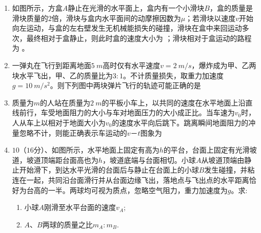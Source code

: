 \begin{enumerate}[leftmargin=0em]
\item 
{}
如图所示，方盒$ A $静止在光滑的水平面上，盒内有一个小滑块$ B $，盒的质量是滑块质量的$ 2 $倍，滑块与盒内水平面间的动摩擦因数为$ \mu $；若滑块以速度$ v $开始向左运动，与盒的左右壁发生无机械能损失的碰撞，滑块在盒中来回运动多次，最终相对于盒静止，则此时盒的速度大小为  ；滑块相对于盒运动的路程为  。
\begin{figure}[h!]
\centering

\end{figure}


\item 
{}
一弹丸在飞行到距离地面$ 5 \ m $高时仅有水平速度$ v=2 \ m/s $，爆炸成为甲、乙两块水平飞出，甲、乙的质量比为$ 3:1 $。不计质量损失，取重力加速度$ g=10 \ m/s^{2} $。则下列图中两块弹片飞行的轨迹可能正确的是  
\begin{figure}[h!]
\centering

\end{figure}



\item 
{}
质量为$ m $的人站在质量为$ 2 \ m $的平板小车上，以共同的速度在水平地面上沿直线前行，车受地面阻力的大小与车对地面压力的大小成正比。当车速为$ v_{0} $时，人从车上以相对于地面大小为$ v_{0} $的速度水平向后跳下。跳离瞬间地面阻力的冲量忽略不计，则能正确表示车运动的$ v － t $图象为  
\begin{figure}[h!]
\centering

\end{figure}



\item
{}
$ 10 $（$ 16 $分）、如图所示，水平地面上固定有高为$ h $的平台，台面上固定有光滑坡道，坡道顶端距台面高也为$ h $，坡道底端与台面相切。小球$ A $从坡道顶端由静止开始滑下，到达水平光滑的台面后与静止在台面上的小球$ B $发生碰撞，并粘连在一起，共同沿台面滑行并从台面边缘飞出，落地点与飞出点的水平距离恰好为台高的一半。两球均可视为质点，忽略空气阻力，重力加速度为$ g $。求:
\begin{enumerate}
\renewcommand{\labelenumi}{\arabic{enumi}.}
\item
小球$ A $刚滑至水平台面的速度$ v_{A} $;
\item 
$ A $、$ B $两球的质量之比$ m_{A} : m_{B} $.


\end{enumerate}
\end{enumerate}
